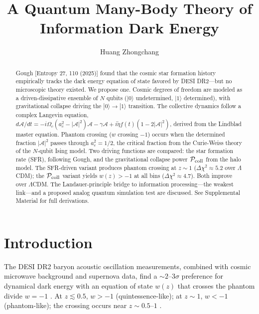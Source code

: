 \documentclass[aps,prd,twocolumn,superscriptaddress]{revtex4-2}
\begin{document}
\title{A Quantum Many-Body Theory of Information Dark Energy}

\author{Huang Zhongchang}

\begin{abstract}
Gough [Entropy 27, 110 (2025)] found that the cosmic star formation history empirically tracks the dark energy equation of state favored by DESI DR2---but no microscopic theory existed. We propose one. Cosmic degrees of freedom are modeled as a driven-dissipative ensemble of $N$ qubits ($|0\rangle$ undetermined, $|1\rangle$ determined), with gravitational collapse driving the $|0\rangle\to|1\rangle$ transition. The collective dynamics follow a complex Langevin equation, $d\mathcal{A}/dt = -i\Omega_c(a_c^2 - |\mathcal{A}|^2)\mathcal{A} - \gamma\mathcal{A} + i\tilde{\eta}f(t)(1-2|\mathcal{A}|^2)$, derived from the Lindblad master equation. Phantom crossing ($w$ crossing $-1$) occurs when the determined fraction $|\mathcal{A}|^2$ passes through $a_c^2=1/2$, the critical fraction from the Curie-Weiss theory of the $N$-qubit Ising model. Two driving functions are compared: the star formation rate (SFR), following Gough, and the gravitational collapse power $\mathcal{P}_{\rm coll}$ from the halo model. The SFR-driven variant produces phantom crossing at $z\sim1$ ($\Delta\chi^2\approx5.2$ over $\Lambda$CDM); the $\mathcal{P}_{\rm coll}$ variant yields $w(z)>-1$ at all bins ($\Delta\chi^2\approx4.7$). Both improve over $\Lambda$CDM. The Landauer-principle bridge to information processing---the weakest link---and a proposed analog quantum simulation test are discussed. See Supplemental Material for full derivations.
\end{abstract}

\maketitle

\section{Introduction}

The DESI DR2 baryon acoustic oscillation measurements, combined with cosmic microwave background and supernova data, find a $\sim 2$--$3\sigma$ preference for dynamical dark energy with an equation of state $w(z)$ that crosses the phantom divide $w=-1$ \cite{DESI:2025}. At $z \lesssim 0.5$, $w > -1$ (quintessence-like); at $z \sim 1$, $w < -1$ (phantom-like); the crossing occurs near $z \sim 0.5$--$1$ \cite{Li:2025,Pang:2025}.
\end{document}
